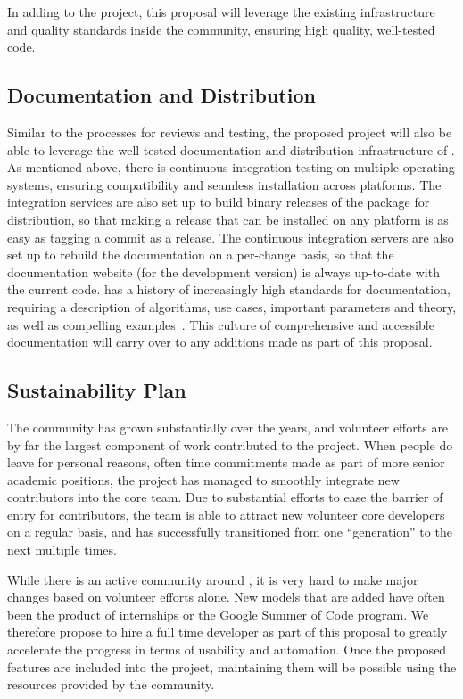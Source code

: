 In adding to the \sklearn{} project, this proposal will leverage the existing infrastructure
and quality standards inside the \sklearn{} community, ensuring high quality, well-tested code.

\subsection{Documentation and Distribution}
Similar to the processes for reviews and testing, the proposed project will
also be able to leverage the well-tested documentation and distribution
infrastructure of \sklearn{}.
As mentioned above, there is continuous integration testing on multiple operating systems,
ensuring compatibility and seamless installation across platforms.
The integration services are also set up to build binary releases of the \sklearn{} package
for distribution, so that making a release that can be installed on any platform is as
easy as tagging a commit as a release.
The continuous integration servers are also set up to rebuild the documentation on a per-change
basis, so that the documentation website (for the development version) is always up-to-date
with the current code.
\sklearn{} has a history of increasingly high standards for documentation,
requiring a description of algorithms, use cases, important parameters and theory,
as well as compelling examples~\textcite{lovesklearn, benlorica}. This culture of comprehensive and accessible documentation
will carry over to any additions made as part of this proposal.

\subsection{Sustainability Plan}
The \sklearn{} community has grown substantially over the years, and volunteer efforts
are by far the largest component of work contributed to the project.
When people do leave for personal reasons, often time commitments made as part
of more senior academic positions, the project has managed to smoothly integrate new
contributors into the core team. Due to substantial efforts to ease the barrier
of entry for contributors, the \sklearn{} team is able to attract new volunteer
core developers on a regular basis, and has successfully transitioned from one
``generation'' to the next multiple times. 

While there is an active community around \sklearn{}, it is very hard to make
major changes based on volunteer efforts alone. New models that are added have
often been the product of internships or the Google Summer of Code program.  We
therefore propose to hire a full time developer as part of this proposal to
greatly accelerate the progress in terms of usability and automation. Once
the proposed features are included into the project, maintaining them will be
possible using the resources provided by the community. 


